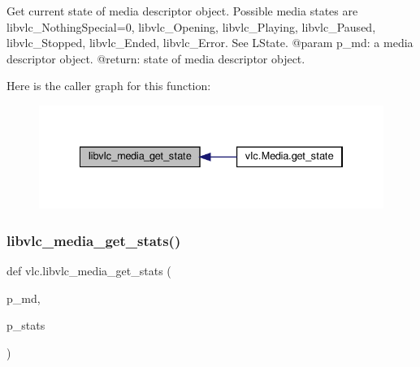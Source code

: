 \begin{DoxyVerb}Get current state of media descriptor object. Possible media states are
libvlc_NothingSpecial=0, libvlc_Opening, libvlc_Playing, libvlc_Paused,
libvlc_Stopped, libvlc_Ended, libvlc_Error.
See L{State}.
@param p_md: a media descriptor object.
@return: state of media descriptor object.
\end{DoxyVerb}
 Here is the caller graph for this function\+:
\nopagebreak
\begin{figure}[H]
\begin{center}
\leavevmode
\includegraphics[width=334pt]{namespacevlc_a08910af5cb2ffede600654c5a567ab85_icgraph}
\end{center}
\end{figure}
\mbox{\label{namespacevlc_a8bf54d145e8e2f4b0de4a3981be8fe66}} 
\subsubsection{\texorpdfstring{libvlc\+\_\+media\+\_\+get\+\_\+stats()}{libvlc\_media\_get\_stats()}}
{\footnotesize\ttfamily def vlc.\+libvlc\+\_\+media\+\_\+get\+\_\+stats (\begin{DoxyParamCaption}\item[{}]{p\+\_\+md,  }\item[{}]{p\+\_\+stats }\end{DoxyParamCaption})}

